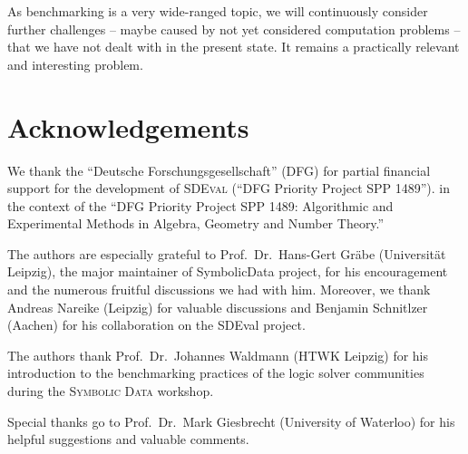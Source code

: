 \documentclass[oribibl,11pt]{article}
\begin{document}
As benchmarking is a very wide-ranged topic, we will continuously
consider further challenges -- maybe caused by not yet considered computation problems -- that we have not dealt with in the present
state.  It remains a practically relevant and interesting problem.

\section*{Acknowledgements}
We thank the ``Deutsche Forschungsgesellschaft'' (DFG) for partial
financial support for the development of \textsc{SDEval} (``DFG
Priority Project SPP 1489'').  in the context of the ``DFG Priority
Project SPP 1489: Algorithmic and Experimental Methods in Algebra,
Geometry and Number Theory.''


The authors are especially grateful to Prof.~Dr.~Hans-Gert Gr\"abe (Universit\"at Leipzig), the major maintainer of {\sc SymbolicData} project, for his encouragement and the
numerous fruitful discussions we had with him. Moreover, we thank Andreas Nareike (Leipzig) for valuable discussions and Benjamin Schnitlzer (Aachen) 
for his collaboration on the {\sc SDEval} project.

The authors thank Prof.~Dr.~Johannes Waldmann (HTWK Leipzig) for his introduction to the
benchmarking practices of the logic solver communities during the
\textsc{Symbolic Data} workshop.

Special thanks go to Prof.~Dr.~Mark Giesbrecht (University of Waterloo) for his helpful suggestions and valuable comments.


\end{document}
